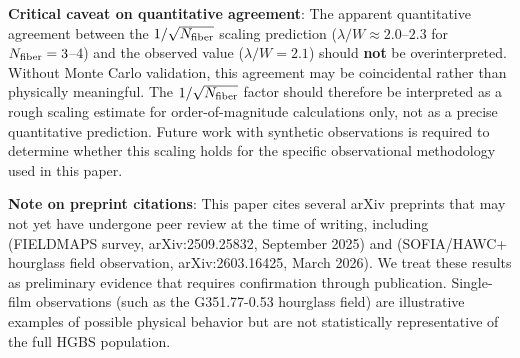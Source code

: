 \documentclass[11pt,a4paper]{article}
\begin{document}
\textbf{Critical caveat on quantitative agreement}: The apparent quantitative agreement between the $1/\sqrt{N_{\rm fiber}}$ scaling prediction ($\lambda/W \approx 2.0$--$2.3$ for $N_{\rm fiber} = 3$--$4$) and the observed value ($\lambda/W = 2.1$) should \textbf{not} be overinterpreted. Without Monte Carlo validation, this agreement may be coincidental rather than physically meaningful. The $1/\sqrt{N_{\rm fiber}}$ factor should therefore be interpreted as a rough scaling estimate for order-of-magnitude calculations only, not as a precise quantitative prediction. Future work with synthetic observations is required to determine whether this scaling holds for the specific observational methodology used in this paper.




\textbf{Note on preprint citations}: This paper cites several arXiv preprints that may not yet have undergone peer review at the time of writing, including \citet{Coude2025} (FIELDMAPS survey, arXiv:2509.25832, September 2025) and \citet{Jadhav2026} (SOFIA/HAWC+ hourglass field observation, arXiv:2603.16425, March 2026). We treat these results as preliminary evidence that requires confirmation through publication. Single-film observations (such as the G351.77-0.53 hourglass field) are illustrative examples of possible physical behavior but are not statistically representative of the full HGBS population.
\end{document}
